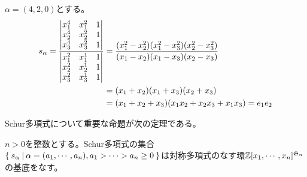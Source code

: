 \documentclass{ltjsreport}
\begin{document}
\begin{eg}
    $\alpha=(4,2,0)$とする。
    \begin{align*}
        s_\alpha=\frac{\begin{vmatrix} x_1^4&x_1^2&1\\
                             x_2^4&x_2^2&1\\
                             x_3^4&x_3^2&1 \end{vmatrix}}
                      {\begin{vmatrix} x_1^2&x_1^1&1\\
                             x_2^2&x_2^1&1\\
                             x_3^2&x_3^1&1 \end{vmatrix}}
                &=\frac{(x_1^2-x_2^2)(x_1^2-x_3^2)(x_2^2-x_3^2)}{(x_1-x_2)(x_1-x_3)(x_2-x_3)}\\
                &=(x_1+x_2)(x_1+x_3)(x_2+x_3)\\
                &=(x_1+x_2+x_3)(x_1x_2+x_2x_3+x_1x_3)=e_1e_2
    \end{align*}
\end{eg}


Schur多項式について重要な命題が次の定理である。

\begin{theo}\label{schur}
    $n>0$を整数とする。Schur多項式の集合$\left\{\:s_\alpha\:\middle|\:\alpha=(a_1,\cdots,a_n), a_1> \cdots> a_n\geq 0\:\right\}$は対称多項式のなす環$\mathbb{Z}[x_1,\cdots,x_n]^{\mathfrak{S}_n}$の基底をなす。
\end{theo}
\end{document}
